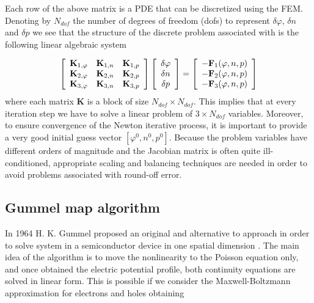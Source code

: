  Each row of the above matrix is a PDE that can be discretized using the FEM. Denoting by $N_{dof}$ the number of degrees of freedom (dofs) to represent $\delta \varphi$, $\delta n$ and $\delta p$ we see that the structure of the discrete problem associated with  is the following linear algebraic system

\begin{equation}
\left[
\begin{array}{ccc}
\mathbf{K}_{1,\varphi} & \mathbf{K}_{1,n} & \mathbf{K}_{1,p} \\
\mathbf{K}_{2,\varphi} & \mathbf{K}_{2,n} & \mathbf{K}_{2,p} \\
\mathbf{K}_{3,\varphi} & \mathbf{K}_{3,n} & \mathbf{K}_{3,p} \\
\end{array}
\right]
\left[
\begin{array}{c}
\delta \varphi  \\
\delta n  \\
\delta p 
\end{array}
\right]
=
\left[
\begin{array}{c}
-\mathbf{F}_1(\varphi,n,p) \\
-\mathbf{F}_2(\varphi,n,p)\\
-\mathbf{F}_3(\varphi,n,p)
\end{array}
\right]
\end{equation}
where each matrix $\mathbf{K}$ is a block of size $N_{dof} \times N_{dof}$. 
This implies that at every iteration step we have to solve a linear problem of $3 \times N_{dof}$ variables.
Moreover, to ensure convergence of the Newton iterative process, it is important to provide a very good initial guess vector $[\varphi^0,n^0,p^0]$. Because the problem variables have different orders of magnitude and the Jacobian matrix is often quite ill-conditioned, appropriate scaling and balancing techniques are needed in order to avoid problems associated with round-off error. 


\subsection{Gummel map algorithm}

In 1964 H. K. Gummel proposed an original and alternative to   approach in order to solve system  in a semiconductor device in one spatial dimension \cite{GummelMap}.
The main idea of the algorithm is to move the nonlinearity to the Poisson equation only, and once obtained the electric potential profile, both continuity equations are solved in linear form. This is possible if we consider the Maxwell-Boltzmann approximation for electrons  and holes  obtaining

